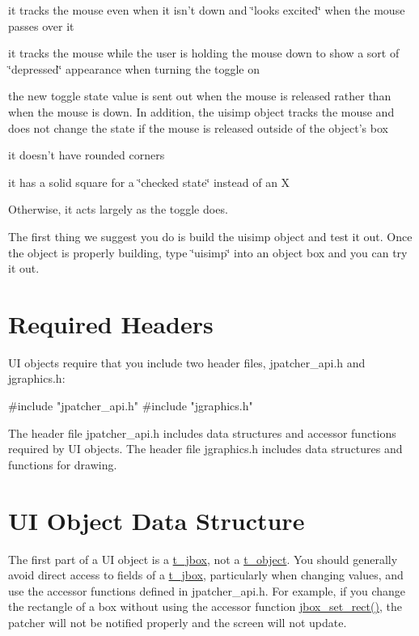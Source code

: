 \begin{DoxyItemize}
\item it tracks the mouse even when it isn't down and \char`\"{}looks excited\char`\"{} when the mouse passes over it
\item it tracks the mouse while the user is holding the mouse down to show a sort of \char`\"{}depressed\char`\"{} appearance when turning the toggle on
\item the new toggle state value is sent out when the mouse is released rather than when the mouse is down. In addition, the uisimp object tracks the mouse and does not change the state if the mouse is released outside of the object's box
\item it doesn't have rounded corners
\item it has a solid square for a \char`\"{}checked state\char`\"{} instead of an X
\end{DoxyItemize}

Otherwise, it acts largely as the toggle does.

The first thing we suggest you do is build the uisimp object and test it out. Once the object is properly building, type \char`\"{}uisimp\char`\"{} into an object box and you can try it out.\hypertarget{chapter_ui_anatomy_chapter_ui_anatomy_headers}{}\section{Required Headers}\label{chapter_ui_anatomy_chapter_ui_anatomy_headers}
UI objects require that you include two header files, jpatcher\_\-api.h and jgraphics.h:


\begin{DoxyCode}
    #include "jpatcher_api.h"
    #include "jgraphics.h"
\end{DoxyCode}


The header file jpatcher\_\-api.h includes data structures and accessor functions required by UI objects. The header file jgraphics.h includes data structures and functions for drawing.\hypertarget{chapter_ui_anatomy_chapter_ui_anatomy_struct}{}\section{UI Object Data Structure}\label{chapter_ui_anatomy_chapter_ui_anatomy_struct}
The first part of a UI object is a \hyperlink{structt__jbox}{t\_\-jbox}, not a \hyperlink{structt__object}{t\_\-object}. You should generally avoid direct access to fields of a \hyperlink{structt__jbox}{t\_\-jbox}, particularly when changing values, and use the accessor functions defined in jpatcher\_\-api.h. For example, if you change the rectangle of a box without using the accessor function \hyperlink{group__jbox_gad342cd402e9dade9bb13b813a13f038c}{jbox\_\-set\_\-rect()}, the patcher will not be notified properly and the screen will not update.

